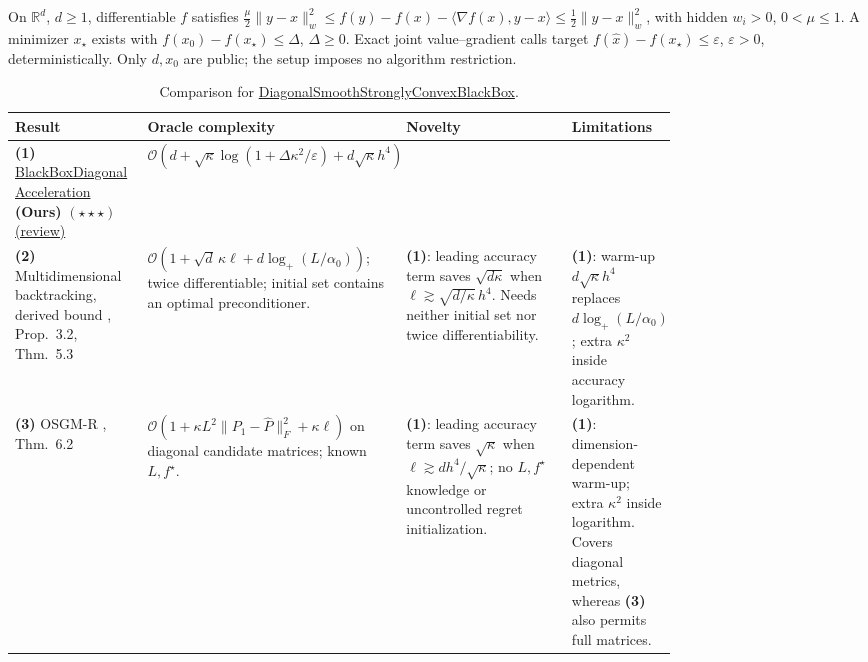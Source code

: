 \begin{table}[tp]
\centering
\caption{Comparison for \href{https://github.com/k3nfalt/longtails/blob/main/LongTails/Setups/DiagonalSmoothStronglyConvexBlackBox.lean}{DiagonalSmoothStronglyConvexBlackBox}.}\label{tab:DiagonalSmoothStronglyConvexBlackBox}
\parbox{\linewidth}{\footnotesize On $\mathbb R^d$, $d\ge1$, differentiable $f$ satisfies $\frac\mu2\|y-x\|_w^2\le f(y)-f(x)-\langle\nabla f(x),y-x\rangle\le\frac12\|y-x\|_w^2$, with hidden $w_i>0$, $0<\mu\le1$. A minimizer $x_\star$ exists with $f(x_0)-f(x_\star)\le\Delta$, $\Delta\ge0$. Exact joint value--gradient calls target $f(\widehat x)-f(x_\star)\le\varepsilon$, $\varepsilon>0$, deterministically. Only $d,x_0$ are public; the setup imposes no algorithm restriction.}\par\smallskip
\begin{threeparttable}
\footnotesize
\setlength{\tabcolsep}{4pt}\renewcommand{\arraystretch}{1.25}
\begin{tabularx}{\linewidth}{@{}>{\raggedright\arraybackslash}p{0.20\linewidth}>{\raggedright\arraybackslash}p{0.32\linewidth}>{\raggedright\arraybackslash}p{0.25\linewidth}>{\raggedright\arraybackslash}X@{}}
\toprule
\textbf{Result} & \textbf{Oracle complexity} & \textbf{Novelty} & \textbf{Limitations} \\
\midrule
\textbf{(1)} \href{https://github.com/k3nfalt/longtails/blob/main/LongTails/Theorems/BlackBoxDiagonalAcceleration.lean}{Black\allowbreak Box\allowbreak Diagonal\allowbreak Acceleration} \textbf{(Ours)} $(\star\star\star)$ \href{https://github.com/k3nfalt/longtails/blob/main/scripts/reviews/BlackBoxDiagonalAcceleration.md}{(review)} & $\mathcal{O}\!\left(d+\sqrt\kappa\log(1+\Delta\kappa^2/\varepsilon)+d\sqrt\kappa h^4\right)$ & & \\
\midrule[1.2pt]
\textbf{(2)} Multidimensional backtracking, derived bound \citep{diagKunstner2023v1}, Prop.~3.2, Thm.~5.3 & $\mathcal{O}(1+\sqrt d\,\kappa\ell+d\log_+(L/\alpha_0))$; twice differentiable; initial set contains an optimal preconditioner. & \textbf{(1)}: leading accuracy term saves $\sqrt{d\kappa}$ when $\ell\gtrsim\sqrt{d/\kappa}\,h^4$. Needs neither initial set nor twice differentiability. & \textbf{(1)}: warm-up $d\sqrt\kappa h^4$ replaces $d\log_+(L/\alpha_0)$; extra $\kappa^2$ inside accuracy logarithm. \\
\midrule
\textbf{(3)} OSGM-R \citep{diagGao2025v2}, Thm.~6.2 & $\mathcal{O}(1+\kappa L^2\|P_1-\widehat P\|_F^2+\kappa\ell)$ on diagonal candidate matrices; known $L,f^\star$. & \textbf{(1)}: leading accuracy term saves $\sqrt\kappa$ when $\ell\gtrsim dh^4/\sqrt\kappa$; no $L,f^\star$ knowledge or uncontrolled regret initialization. & \textbf{(1)}: dimension-dependent warm-up; extra $\kappa^2$ inside logarithm. Covers diagonal metrics, whereas \textbf{(3)} also permits full matrices. \\

\end{tabularx}
\end{threeparttable}
\end{table}
